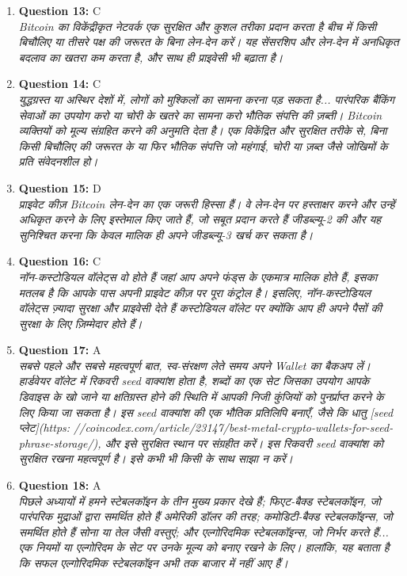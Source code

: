 \documentclass[12pt,a4paper]{article}
\begin{document}
\begin{enumerate}
\item \textbf{Question 13:} C
\\ \textit{Bitcoin का विकेंद्रीकृत नेटवर्क एक सुरक्षित और कुशल तरीका प्रदान करता है
बीच में किसी बिचौलिए या तीसरे पक्ष की जरूरत के बिना लेन-देन करें। यह
सेंसरशिप और लेन-देन में अनधिकृत बदलाव का खतरा कम करता है,
और साथ ही प्राइवेसी भी बढ़ाता है।}

\item \textbf{Question 14:} C
\\ \textit{युद्धग्रस्त या अस्थिर देशों में, लोगों को मुश्किलों का सामना करना पड़ सकता है...
पारंपरिक बैंकिंग सेवाओं का उपयोग करो या चोरी के खतरे का सामना करो
भौतिक संपत्ति की ज़ब्ती। Bitcoin व्यक्तियों को मूल्य संग्रहित करने की अनुमति देता है।
एक विकेंद्रित और सुरक्षित तरीके से, बिना किसी बिचौलिए की जरूरत के
या फिर भौतिक संपत्ति जो महंगाई, चोरी या ज़ब्त जैसे जोखिमों के प्रति संवेदनशील हो।}

\item \textbf{Question 15:} D
\\ \textit{प्राइवेट कीज़ Bitcoin लेन-देन का एक जरूरी हिस्सा हैं।
वे लेन-देन पर हस्ताक्षर करने और उन्हें अधिकृत करने के लिए इस्तेमाल किए जाते हैं, जो सबूत प्रदान करते हैं
जीडब्ल्यू-2 की और यह सुनिश्चित करना कि केवल मालिक ही अपने जीडब्ल्यू-3 खर्च कर सकता है।}

\item \textbf{Question 16:} C
\\ \textit{नॉन-कस्टोडियल वॉलेट्स वो होते हैं जहां आप अपने फंड्स के एकमात्र मालिक होते हैं,
इसका मतलब है कि आपके पास अपनी प्राइवेट कीज़ पर पूरा कंट्रोल है। इसलिए,
नॉन-कस्टोडियल वॉलेट्स ज़्यादा सुरक्षा और प्राइवेसी देते हैं
कस्टोडियल वॉलेट पर क्योंकि आप ही अपने पैसों की सुरक्षा के लिए ज़िम्मेदार होते हैं।}

\item \textbf{Question 17:} A
\\ \textit{सबसे पहले और सबसे महत्वपूर्ण बात, स्व-संरक्षण लेते समय अपने Wallet का बैकअप लें। हार्डवेयर वॉलेट में रिकवरी seed वाक्यांश होता है, शब्दों का एक सेट जिसका उपयोग आपके डिवाइस के खो जाने या क्षतिग्रस्त होने की स्थिति में आपकी निजी कुंजियों को पुनर्प्राप्त करने के लिए किया जा सकता है। इस seed वाक्यांश की एक भौतिक प्रतिलिपि बनाएँ, जैसे कि धातु [seed प्लेट](https: //coincodex.com/article/23147/best-metal-crypto-wallets-for-seed-phrase-storage/), और इसे सुरक्षित स्थान पर संग्रहीत करें। इस रिकवरी seed वाक्यांश को सुरक्षित रखना महत्वपूर्ण है। इसे कभी भी किसी के साथ साझा न करें।}

\item \textbf{Question 18:} A
\\ \textit{पिछले अध्यायों में हमने स्टेबलकॉइन के तीन मुख्य प्रकार देखे हैं;
फिएट-बैक्ड स्टेबलकॉइन, जो पारंपरिक मुद्राओं द्वारा समर्थित होते हैं
अमेरिकी डॉलर की तरह; कमोडिटी-बैक्ड स्टेबलकॉइन्स, जो समर्थित होते हैं
सोना या तेल जैसी वस्तुएं; और एल्गोरिदमिक स्टेबलकॉइन्स, जो निर्भर करते हैं...
एक नियमों या एल्गोरिदम के सेट पर उनके मूल्य को बनाए रखने के लिए। हालांकि,
यह बताता है कि सफल एल्गोरिदमिक स्टेबलकॉइन अभी तक बाजार में नहीं आए हैं।}


\end{enumerate}
\end{document}
